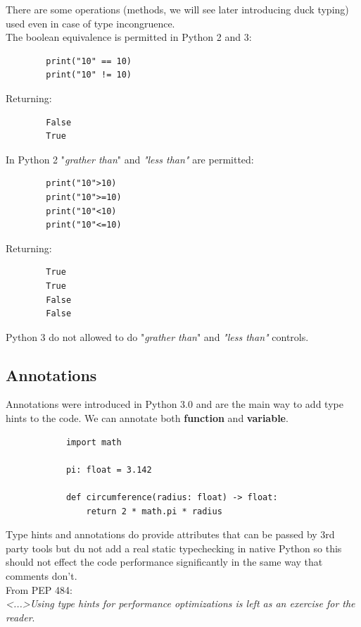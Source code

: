 \documentclass[12pt]{article}
\begin{document}
		
		There are some operations (methods, we will see later introducing duck typing) used even in case of type incongruence. \\
		The boolean equivalence is permitted in Python 2 and 3: 
		
		\begin{lstlisting}
		print("10" == 10)
		print("10" != 10)
		\end{lstlisting}
		
		Returning:
		
		\begin{lstlisting}
		False
		True
		\end{lstlisting}
		
		In Python 2 "\textit{grather than}" and \textit{"less than"} are permitted:
		
		\begin{lstlisting}
		print("10">10)
		print("10">=10)
		print("10"<10)
		print("10"<=10)
		\end{lstlisting}
		
		Returning:
		
		\begin{lstlisting}
		True
		True
		False
		False
		\end{lstlisting}
		
		Python 3 do not allowed to do "\textit{grather than}" and \textit{"less than"} controls.\\
		
	\subsection{Annotations}
		Annotations were introduced in Python 3.0 and are the main way to add type hints to the code. We can annotate both \textbf{function} and \textbf{variable}.
		
		\begin{lstlisting}
			import math
			
			pi: float = 3.142
			
			def circumference(radius: float) -> float:
				return 2 * math.pi * radius
		\end{lstlisting}
		
		Type hints and annotations do provide attributes that can be passed by 3rd party tools but du not add a real static typechecking in native Python so this should not effect the code performance significantly in the same way that comments don't.\\
		From PEP 484:\\
		\textit{ <...>Using type hints for performance optimizations is left as an exercise for the reader}.
		
\end{document}
